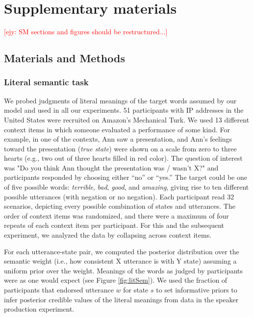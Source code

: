 \documentclass[12pt]{article}
\newcommand{\ejy}[1]{\textcolor{Red}{[ejy: #1]}}
\begin{document}

\section*{Supplementary materials}

\ejy{SM sections and figures should be restructured...}

\subsection*{Materials and Methods}

\subsubsection*{Literal semantic task}

We probed judgments of literal meanings of the target words assumed by our model and used in all our experiments. 
51 participants with IP addresses in the United States were recruited on Amazon's Mechanical Turk. 
We used 13 different context items in which someone evaluated a performance of some kind. 
For example, in one of the contexts, Ann saw a presentation, and Ann's feelings toward the presentation (\emph{true state}) were shown on a scale from zero to three hearts 
(e.g., two out of three hearts filled in red color). 
The question of interest was "Do you think Ann thought the presentation was / wasn't X?" and participants responded by choosing either \enquote{no} or \enquote{yes.}  
The target could be one of five possible words: \emph{terrible}, \emph{bad}, \emph{good}, and \emph{amazing}, giving rise to ten different possible utterances (with negation or no negation). 
Each participant read 32 scenarios, depicting every possible combination of states and utterances. 
The order of context items was randomized, and there were a maximum of four repeats of each context item per participant. 
For this and the subsequent experiment, we analyzed the data by collapsing across context items. 

For each utterance-state pair, we computed the posterior distribution over the semantic weight 
(i.e., how consistent X utterance is with Y state) assuming a uniform prior over the weight.
Meanings of the words as judged by participants were as one would expect (see Figure \ref{fig:litSem}). 
We used the fraction of participants that endorsed utterance $w$ for state $s$ to set informative priors to infer posterior credible values of the literal meanings from data in the speaker production experiment.
\end{document}
